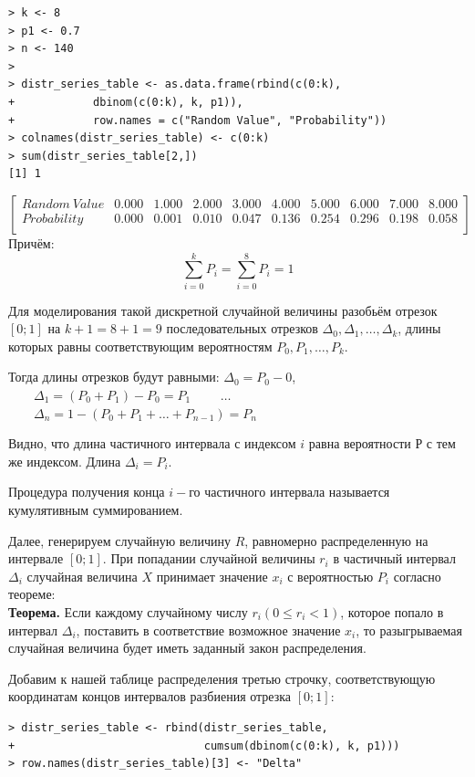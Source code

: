 \documentclass[14pt,a4paper]{scrartcl}
\begin{document}
\begin{lstlisting}
> k <- 8
> p1 <- 0.7
> n <- 140
> 
> distr_series_table <- as.data.frame(rbind(c(0:k),
+            dbinom(c(0:k), k, p1)), 
+            row.names = c("Random Value", "Probability"))
> colnames(distr_series_table) <- c(0:k)
> sum(distr_series_table[2,])
[1] 1
\end{lstlisting}

\begin{equation*}
	\begin{bmatrix}{}
	Random \: Value & 0.000 & 1.000 & 2.000 & 3.000 & 4.000 & 5.000 & 6.000 & 7.000 & 8.000 \\ 
	Probability & 0.000 & 0.001 & 0.010 & 0.047 & 0.136 & 0.254 & 0.296 & 0.198 & 0.058 \\ 
	\end{bmatrix}
\end{equation*}
Причём:
\begin{equation*}
	\sum_{i = 0}^{k}P_i = \sum_{i = 0}^{8}P_i = 1
\end{equation*}

Для моделирования такой дискретной случайной величины разобьём отрезок $[0;1]$ на $k+1 = 8 + 1 = 9$ последовательных отрезков $\Delta_0, \Delta_1, \dots, \Delta_{k}$, длины которых равны соответствующим вероятностям $P_0, P_1, \dots, P_{k}$.

Тогда длины отрезков будут равными: $\Delta_0 = P_0 - 0$, $\qquad \Delta_1 = (P_0 + P_1) - P_0 = P_1$ $\qquad \dots$$\qquad \Delta_n = 1 - (P_0 + P_1 + \dots + P_{n-1}) = P_n$

Видно, что длина частичного интервала с индексом $i$ равна вероятности $Р$ с тем же индексом. Длина $\Delta_i = P_i$.

Процедура получения конца $i-$го частичного интервала называется кумулятивным суммированием.

Далее, генерируем случайную величину $R$, равномерно распределенную на интервале $[0;1]$. При попадании случайной величины $r_i$ в частичный интервал $\Delta_i$ случайная величина $X$ принимает значение $x_i$ с вероятностью $P_i$ согласно теореме:\\
\textbf{Теорема.} Если каждому случайному числу $r_i(0\leq r_i < 1)$, которое попало в интервал $\Delta_i$, поставить в соответствие возможное значение $x_i$, то разыгрываемая случайная величина будет иметь заданный закон распределения.

Добавим к нашей таблице распределения третью строчку, соответствующую координатам концов интервалов разбиения отрезка $[0;1]$:
\begin{lstlisting}
> distr_series_table <- rbind(distr_series_table,
+                             cumsum(dbinom(c(0:k), k, p1)))
> row.names(distr_series_table)[3] <- "Delta"
\end{lstlisting}
\end{document}
